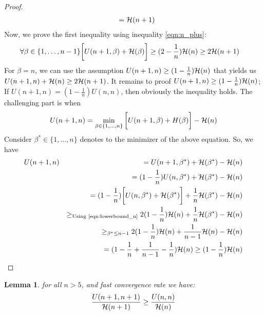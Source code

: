 \documentclass{article}
\newtheorem{lemma}{Lemma}
\newcommand{\bound}{{\cal H}}
\begin{document}
\begin{proof}
\begin{eqnarray}
       & & = \bound(n+1)
	\end{eqnarray}
	Now, we prove the first inequality using inequality \ref{eqn:n_plus}: 
	\begin{eqnarray*}
       &  \forall \beta \in \{1,\ldots,n-1\}\bigg[U(n+1,\beta) +
       \bound(\beta) \bigg] \geq (2-\frac{1}{n})\bound(n) \geq 2 \bound(n+1)
	\end{eqnarray*}
	For $\beta = n$, we can use the assumption $U(n+1,n)\geq
	(1-\frac{1}{n})\bound(n)$ that yields us $U(n+1,n) + \bound(n)\geq 2
	\bound(n+1)$. It remains to proof $U(n+1,n) \geq (1-\frac{1}{n}) \bound(n)$; 
	If $U(n+1,n) = (1-\frac{1}{n})U(n,n)$, then obviously the inequality holds. 
	The challenging part is when 
	\[
	U(n+1,n) = \min_{\beta \in \{1,\ldots,n\}}  \bigg[ U(n+1,\beta) +H(\beta)
	\bigg] - \bound(n)
	\]
	Consider $\beta^* \in \{1,\ldots,n\}$ denotes to the minimizer of the above
	equation. So, we have
	\begin{eqnarray*}
		& U(n+1,n) & = U(n+1,\beta^*) + \bound(\beta^*) - \bound(n)\\
		& & = (1-\frac{1}{n}) U(n,\beta^*) +\bound(\beta^*) - \bound(n)\\ 
		& & = (1-\frac{1}{n})\bigg[ U(n,\beta^*) + \bound(\beta^*) \bigg] +
		\frac{1}{n} \bound(\beta^*)-\bound(n)\\ 
		& & \geq_{\text{Using \ref{eqn:lowerbound_n}} } 2 (1-\frac{1}{n}) \bound(n)
		+\frac{1}{n}  \bound(\beta^*) - \bound(n) \\ 
		& & \geq_{\beta^*\leq n-1}  2 (1-\frac{1}{n}) \bound(n) + \frac{1}{n-1}
		\bound(n) -\bound(n) \\ 
		& & = (1- \frac{1}{n} + \frac{1}{n-1}-\frac{1}{n})\bound(n) \geq
		(1-\frac{1}{n} )\bound(n)
	\end{eqnarray*}
	
\end{proof}
\begin{lemma}
	for all $n>5$, and fast convergence rate we have: 
	\begin{equation*}
		\frac{U(n+1,n+1)}{\bound(n+1)}\geq \frac{U(n,n)}{\bound(n)}
	\end{equation*}
\end{lemma}
\end{document}
